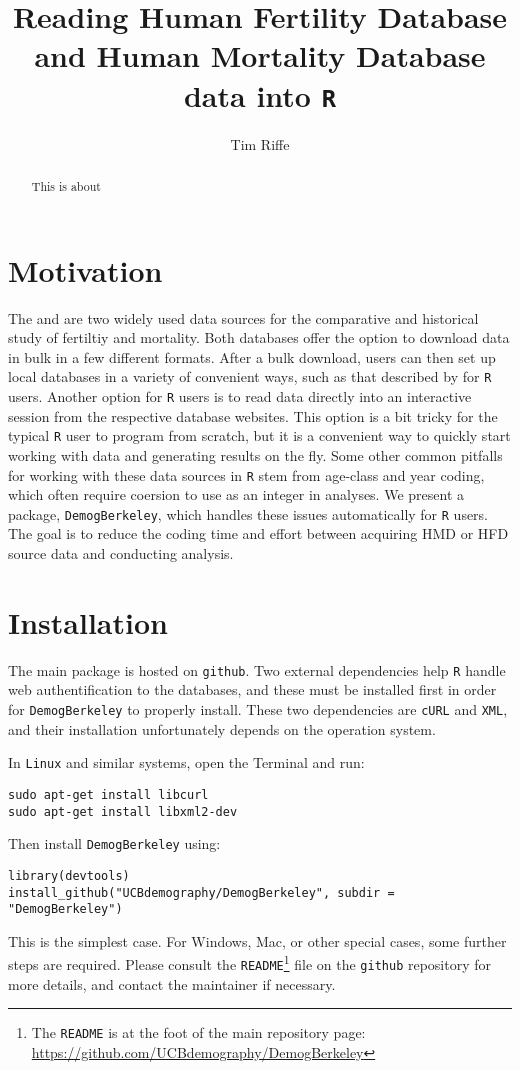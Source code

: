 \documentclass{article}
\begin{document}
\title{Reading Human Fertility Database and Human Mortality Database data into \texttt{R}}
\author{Tim Riffe}
\maketitle
\begin{abstract}
This is about
\end{abstract}

\section{Motivation}
The \citet{HFD} and \citet{HMD} are two widely used data sources
for the comparative and historical study of fertiltiy and mortality. Both
databases offer the option to download data in bulk in a few different formats. After a bulk
download, users can then set up local databases in a variety of
convenient ways, such as that described by \citet{minton2015} for \texttt{R}
\citep{Rcitation} users. Another option for \texttt{R} users is to read data
directly into an interactive session from the respective database websites. This
option is a bit tricky for the typical \texttt{R} user to program from scratch,
but it is a convenient way to quickly start working with data and
generating results on the fly. Some other common pitfalls for working with
these data sources in \texttt{R} stem from age-class and year coding, which
often require coersion to use as an integer in analyses. We present a package,
\texttt{DemogBerkeley}, which handles these issues automatically for \texttt{R}
users. The goal is to reduce the coding time and effort between acquiring
HMD or HFD source data and conducting analysis.

\section{Installation}
The main package is hosted on \texttt{github}. Two external dependencies help
\texttt{R} handle web authentification to the databases, and these must be installed first in order for \texttt{DemogBerkeley}
to properly install. These two dependencies are \texttt{cURL} and \texttt{XML},
and their installation unfortunately depends on the operation system. 

In \texttt{Linux} and similar systems, open the Terminal and run:
\begin{verbatim}
sudo apt-get install libcurl
sudo apt-get install libxml2-dev
\end{verbatim}
Then install \texttt{DemogBerkeley} using:
\begin{verbatim}
library(devtools)
install_github("UCBdemography/DemogBerkeley", subdir = "DemogBerkeley")
\end{verbatim}
This is the simplest case. For Windows, Mac, or other special cases, some
further steps are required. Please consult the
\texttt{README}\footnote{The
\texttt{README} is at the
foot of the main repository
page: \url{https://github.com/UCBdemography/DemogBerkeley}} file on the
\texttt{github} repository for more details, and contact the maintainer if
necessary.
\end{document}
